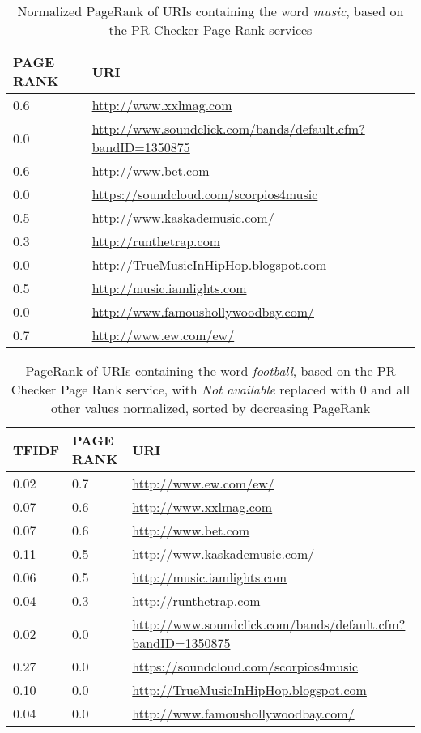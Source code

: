 \begin{table}
\small
\begin{tabular}{ | p{2.4cm} | p{8.0cm} | }
\hline
\textbf{PAGE RANK} & \textbf{URI} \\
\hline
0.6  & \url{http://www.xxlmag.com } \\
\hline
0.0 & \url{ http://www.soundclick.com/bands/default.cfm?bandID=1350875} \\
\hline
0.6 & \url{ http://www.bet.com} \\
\hline
0.0 & \url{ https://soundcloud.com/scorpios4music} \\
\hline 
0.5 & \url{ http://www.kaskademusic.com/} \\
\hline
0.3 & \url{http://runthetrap.com} \\
\hline
0.0 & \url{ http://TrueMusicInHipHop.blogspot.com} \\
\hline
0.5 & \url{ http://music.iamlights.com} \\
\hline
0.0 & \url{ http://www.famoushollywoodbay.com/} \\
\hline
0.7 &\url{ http://www.ew.com/ew/} \\
\hline
\end{tabular}
\caption{Normalized PageRank of URIs containing the word \emph{music}, based on the PR Checker Page Rank services}
\label{table:q3-2}
\end{table}
\begin{table}
\small
\begin{tabular}{ | p{2.4cm} | p{2.4cm} | p{8.0cm} | }
\hline
\textbf{TFIDF} & \textbf{PAGE RANK} & \textbf{URI}  \\
\hline
0.02 & 0.7 &\url{ http://www.ew.com/ew/} \\
\hline
0.07 & 0.6  & \url{http://www.xxlmag.com } \\
\hline
0.07 & 0.6 & \url{ http://www.bet.com} \\
\hline
0.11 & 0.5 & \url{ http://www.kaskademusic.com/} \\
\hline
0.06 & 0.5 & \url{ http://music.iamlights.com} \\
\hline
0.04 & 0.3 & \url{http://runthetrap.com} \\
\hline
0.02 & 0.0 & \url{ http://www.soundclick.com/bands/default.cfm?bandID=1350875} \\
\hline
0.27 & 0.0 & \url{ https://soundcloud.com/scorpios4music} \\
\hline 
0.10 & 0.0 & \url{ http://TrueMusicInHipHop.blogspot.com} \\
\hline
0.04 & 0.0 & \url{ http://www.famoushollywoodbay.com/} \\


\hline
\end{tabular}
\caption{PageRank of URIs containing the word \emph{football}, based on the PR Checker Page Rank service, with \emph{Not available} replaced with $0$ and all other values normalized, sorted by decreasing PageRank}
\label{table:q3-3}
\end{table}